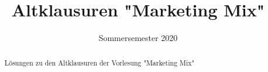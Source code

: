 \documentclass[]{article}
\title{Altklausuren "Marketing Mix"}
\date{Sommersemester 2020}
\begin{document}
\maketitle

\begin{abstract}
Lösungen zu den Altklausuren der Vorlesung "Marketing Mix"
\end{abstract}

\tableofcontents
\newpage


\end{document}
